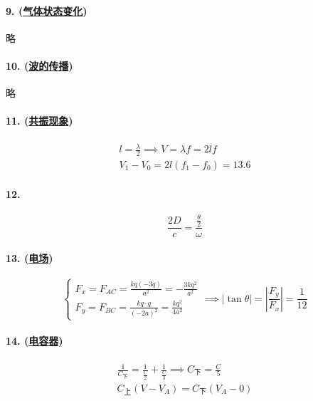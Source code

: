 \paragraph{9. (\hyperref[subsec:气体状态变化]{气体状态变化})} 略

\paragraph{10. (\hyperref[subsec:波的传播]{波的传播})} 略

\paragraph{11. (\hyperref[subsec:共振现象]{共振现象})}

\begin{gather*}
    l=\frac\lambda2\implies V=\lambda f=2lf\\
    V_1-V_0=2l(f_1-f_0)=13.6
\end{gather*}

\paragraph{12.}

\begin{equation*}
    \frac{2D}{c}=\frac{\frac\theta2}{\omega}
\end{equation*}

\paragraph{13. (\hyperref[subsec:电场]{电场})}

\begin{equation*}
    \begin{cases}
        F_x=F_{AC}=\frac{kq(-3q)}{a^2}=-\frac{3kq^2}{a^2}\\
        F_y=F_{BC}=\frac{kq\cdot q}{(-2a)^2}=\frac{kq^2}{4a^2}
    \end{cases}\implies
    |\tan\theta|=\left|\frac{F_y}{F_x}\right|=\frac{1}{12}
\end{equation*}

\paragraph{14. (\hyperref[subsec:电容器]{电容器})}

\begin{gather*}
    \frac{1}{C_\text{下}}=\frac{1}{\frac{C}{2}}+\frac{1}{\frac{C}{3}}\implies C_\text{下}=\frac{C}{5}\\
    C_\text{上}(V-V_A)=C_\text{下}(V_A-0)
\end{gather*}

